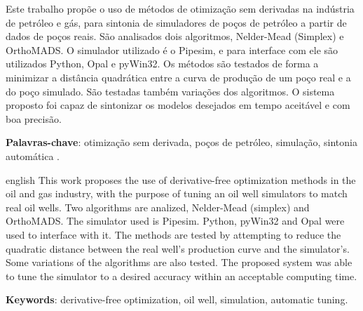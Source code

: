 
\setlength{\absparsep}{18pt} %
\begin{resumo}

Este trabalho propõe o uso de métodos de otimização sem derivadas na indústria de petróleo e gás, para sintonia de simuladores de poços de petróleo a partir de dados de poços reais. São analisados dois algoritmos, Nelder-Mead (Simplex) e OrthoMADS.
O simulador utilizado é o Pipesim, e para interface com ele são utilizados Python, Opal e pyWin32.
Os métodos são testados de forma a minimizar a distância quadrática entre a curva de produção de um poço real e a do poço simulado. São testadas também variações dos algoritmos.
O sistema proposto foi capaz de sintonizar os modelos desejados em tempo aceitável e com boa precisão.


 \textbf{Palavras-chave}: otimização sem derivada, poços de petróleo, simulação, sintonia automática .
\end{resumo}

\begin{resumo}[Abstract]
 \begin{otherlanguage*}{english}
This work proposes the use of derivative-free optimization methods in the oil and gas industry, with the purpose of tuning an oil well simulators to match real oil wells. Two algorithms are analized, Nelder-Mead (simplex) and OrthoMADS.
The simulator used is Pipesim. Python, pyWin32 and Opal were used to interface with it.
The methods are tested by attempting to reduce the quadratic distance between the real well's production curve and the simulator's.
Some variations of the algorithms are also tested.
The proposed system was able to tune the simulator to a desired accuracy within an acceptable computing time.


   \vspace{\onelineskip}
 
   \noindent 
   \textbf{Keywords}: derivative-free optimization, oil well, simulation, automatic tuning.
 \end{otherlanguage*}
\end{resumo}
